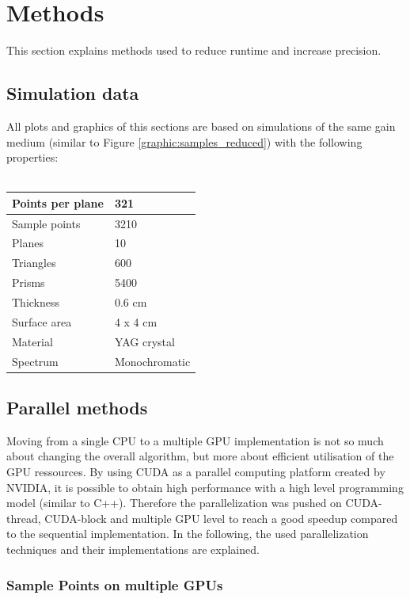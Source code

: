 \section{Methods}
This section explains methods used to reduce runtime and
increase precision.

\subsection{Simulation data}
All plots and graphics of this sections
are based on simulations of the same gain medium (similar to Figure \ref{graphic:samples_reduced})
with the following properties:
\\
\\
\begin{tabular}{| l | l |}
\hline
Points per plane        & 321\\
\hline
Sample points           & 3210\\
\hline
Planes                  & 10\\
\hline
Triangles               & 600\\
\hline
Prisms                  & 5400\\
\hline
Thickness               & 0.6 cm\\
\hline
Surface area            & 4 x 4 cm\\
\hline
Material                & YAG crystal\\
\hline
Spectrum                & Monochromatic\\
\hline
\end{tabular}

\subsection{Parallel methods}
\label{subsec:parallel_methods}
Moving from a single CPU to a multiple
GPU implementation is not so much about changing the overall algorithm,
but more about efficient utilisation of the GPU ressources. 
By using CUDA\cite{cuda} as a parallel computing platform created by NVIDIA\cite{nvidia},
it is possible to obtain high performance with a high level 
programming model (similar to C++). Therefore the parallelization was pushed on CUDA-thread, 
CUDA-block and multiple GPU level to reach a good speedup compared to 
the sequential implementation.
In the following, the used parallelization
techniques and their implementations are explained.

\subsubsection{Sample Points on multiple GPUs}
\label{subsubsec:multigpu}

